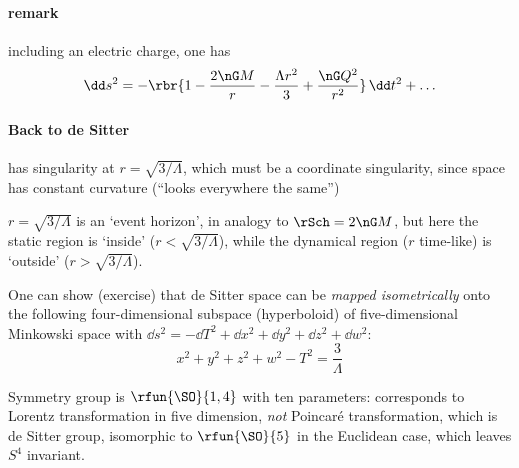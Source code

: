 \paragraph{remark} including an electric charge, one has
\begin{equation}
\dd s^2 = -\rbr{1-\frac{2\nG M}{r} - \frac{\Lambda r^2}{3} + \frac{\nG 
Q^2}{r^2}}\,\dd t^2 + \ldots
\end{equation}

\paragraph{Back to de Sitter}  has singularity at $r = 
\sqrt{3/\Lambda}$, which must be a coordinate singularity, since space has 
constant curvature (``looks everywhere the same'')

$r = \sqrt{3/\Lambda}$ is an `event horizon', in analogy to $\rSch = 2\nG M$, 
but here the static region is `inside' ($r < \sqrt{3/\Lambda}$), while the 
dynamical region ($r$ time-like) is `outside' ($r > \sqrt{3/\Lambda}$).

One can show (exercise) that de Sitter space can be \emph{mapped isometrically} 
onto the following four-dimensional subspace (hyperboloid) of five-dimensional 
Minkowski space with $\dd s^2 = -\dd T^2 + \dd x^2 + \dd y^2 + \dd z^2 + \dd 
w^2$:
\begin{equation}
x^2 + y^2 + z^2 + w^2 - T^2 = \frac{3}{\Lambda}
\end{equation}

Symmetry group is $\rfun{\SO}{1,4}$ with ten parameters: corresponds to Lorentz 
transformation in five dimension, \emph{not} Poincaré transformation, which is 
de Sitter group, isomorphic to $\rfun{\SO}{5}$ in the Euclidean case, which 
leaves $S^4$ invariant.
